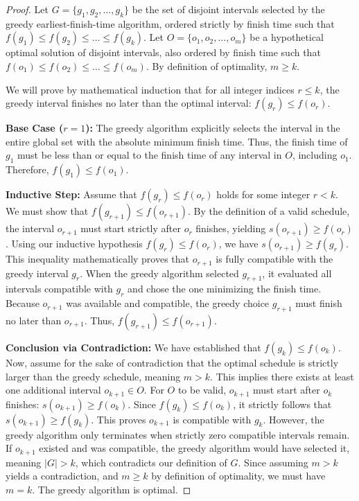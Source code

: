 \documentclass[11pt, a4paper]{article}
\theoremstyle{definition}
\theoremstyle{plain}
\begin{document}
\begin{proof}
Let $G = \{g_1, g_2, \dots, g_k\}$ be the set of disjoint intervals selected by the greedy earliest-finish-time algorithm, ordered strictly by finish time such that $f(g_1) \le f(g_2) \le \dots \le f(g_k)$.
Let $O = \{o_1, o_2, \dots, o_m\}$ be a hypothetical optimal solution of disjoint intervals, also ordered by finish time such that $f(o_1) \le f(o_2) \le \dots \le f(o_m)$. By definition of optimality, $m \ge k$.

We will prove by mathematical induction that for all integer indices $r \le k$, the greedy interval finishes no later than the optimal interval: $f(g_r) \le f(o_r)$.

\textbf{Base Case ($r = 1$):} The greedy algorithm explicitly selects the interval in the entire global set with the absolute minimum finish time. Thus, the finish time of $g_1$ must be less than or equal to the finish time of any interval in $O$, including $o_1$. Therefore, $f(g_1) \le f(o_1)$.

\textbf{Inductive Step:} Assume that $f(g_r) \le f(o_r)$ holds for some integer $r < k$. We must show that $f(g_{r+1}) \le f(o_{r+1})$. 
By the definition of a valid schedule, the interval $o_{r+1}$ must start strictly after $o_r$ finishes, yielding $s(o_{r+1}) \ge f(o_r)$. 
Using our inductive hypothesis $f(g_r) \le f(o_r)$, we have $s(o_{r+1}) \ge f(g_r)$. This inequality mathematically proves that $o_{r+1}$ is fully compatible with the greedy interval $g_r$. 
When the greedy algorithm selected $g_{r+1}$, it evaluated all intervals compatible with $g_r$ and chose the one minimizing the finish time. Because $o_{r+1}$ was available and compatible, the greedy choice $g_{r+1}$ must finish no later than $o_{r+1}$. Thus, $f(g_{r+1}) \le f(o_{r+1})$.

\textbf{Conclusion via Contradiction:} We have established that $f(g_k) \le f(o_k)$. Now, assume for the sake of contradiction that the optimal schedule is strictly larger than the greedy schedule, meaning $m > k$. This implies there exists at least one additional interval $o_{k+1} \in O$.
For $O$ to be valid, $o_{k+1}$ must start after $o_k$ finishes: $s(o_{k+1}) \ge f(o_k)$.
Since $f(g_k) \le f(o_k)$, it strictly follows that $s(o_{k+1}) \ge f(g_k)$. 
This proves $o_{k+1}$ is compatible with $g_k$. However, the greedy algorithm only terminates when strictly zero compatible intervals remain. If $o_{k+1}$ existed and was compatible, the greedy algorithm would have selected it, meaning $|G| > k$, which contradicts our definition of $G$. Since assuming $m > k$ yields a contradiction, and $m \ge k$ by definition of optimality, we must have $m = k$. The greedy algorithm is optimal.
\end{proof}
\end{document}
